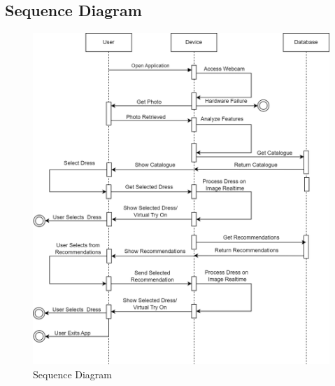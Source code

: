 	\subsection{Sequence Diagram}
		\begin{figure}[h!]
			\includegraphics[width=\textwidth]{components/images/sequence.png}
			\caption{Sequence Diagram}
			\label{fig:sequence}
		\end{figure}

	\pagebreak

